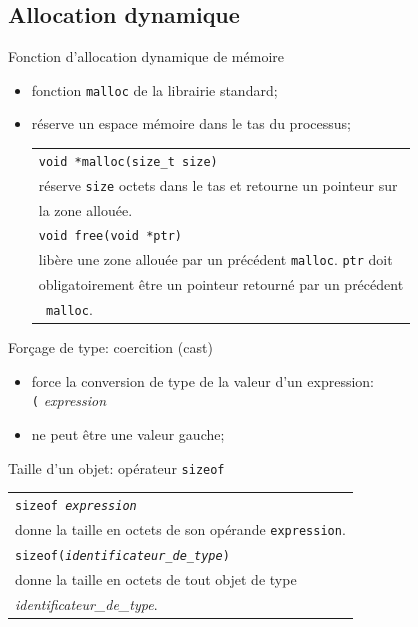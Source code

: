 \begin{frame}

\section{Allocation dynamique}

 Fonction d'allocation dynamique de m\'emoire
\begin{itemize}
  \item fonction {\tt malloc} de la librairie standard;
  \item r\'eserve un espace m\'emoire dans le tas du processus;
\begin{tabular}[h]{|l|}
\hline
{\tt void *malloc(size\_t size)}\\
r\'eserve {\tt size} octets dans le tas et retourne un pointeur 
sur \\ la zone allou\'ee.\\
\hline
{\tt void free(void *ptr)}\\
lib\`ere une zone allou\'ee par un pr\'ec\'edent {\tt malloc}. {\tt ptr} doit
\\
obligatoirement \^etre un pointeur retourn\'e par un pr\'ec\'edent \\ {\tt
  malloc}.\\
\hline
\end{tabular}

\end{itemize}

 For\c{c}age de type: coercition (cast)
\begin{itemize}
\item force la conversion de type de la valeur d'un expression:\\
\hspace*{10mm} {\tt (}\hspace{3mm}{\it type}\hspace{3mm}{\tt
  )}\hspace{3mm}
{\it expression}
\item ne peut \^etre une valeur gauche;
\end{itemize}

 Taille d'un objet: op\'erateur {\tt sizeof}
\begin{tabular}[h]{|l|}
\hline
{\tt sizeof {\it expression}}\\
donne la taille en octets de son op\'erande {\tt expression}.\\
\hline
{\tt sizeof({\it identificateur\_de\_type})}\\
donne la taille en octets de tout objet de type \\
{\it identificateur\_de\_type}.\\
\hline
\end{tabular}


\end{frame}
